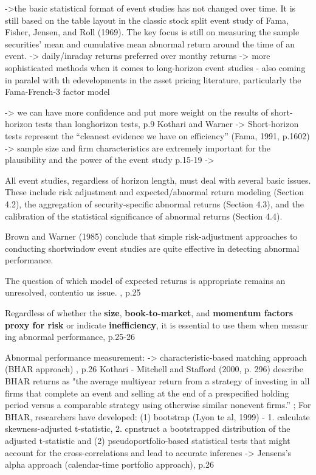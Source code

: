 \documentclass[12pt,a4paper]{article}
\begin{document}
->the basic statistical format of event studies has not changed over time. It is still based on the table layout in the classic stock split event study of Fama, Fisher, Jensen, and Roll (1969). The key focus is still on measuring the sample securities’ mean and cumulative mean abnormal return around the time of an event.
-> daily/inraday returns preferred over monthy returns
-> more sophisticated methods when it comes to long-horizon event studies - also coming in paralel with th edevelopments in the asset pricing literature, particularly the Fama-French-3 factor model

-> we can have more confidence and put more weight on the results of short-horizon tests than longhorizon tests, p.9 Kothari and Warner
-> Short-horizon tests represent the “cleanest evidence we have on efficiency” (Fama, 1991, p.1602)
-> sample size and firm characteristics are extremely important for the plausibility and the power of the event study p.15-19
-> 

All event studies, regardless of horizon length, must deal with several basic issues. These include risk adjustment and expected/abnormal return modeling (Section 4.2), the aggregation of security-specific abnormal returns (Section 4.3), and the calibration of the statistical significance of abnormal returns (Section 4.4).

Brown and Warner (1985) conclude that simple risk-adjustment approaches to conducting shortwindow event studies are quite effective in detecting abnormal performance.

The question of which model of expected returns is appropriate remains an unresolved, contentio us issue. , p.25

Regardless of whether the \textbf{size}, \textbf{book-to-market}, and \textbf{momentum factors proxy for risk }or indicate \textbf{inefficiency}, it is essential to use them when measur ing abnormal performance, p.25-26

Abnormal performance measurement: 
-> characteristic-based matching approach (BHAR approach) , p.26 Kothari - Mitchell and Stafford (2000, p. 296) describe BHAR returns as "the average multiyear return from a strategy of investing in all firms that complete an event and selling at the end of a prespecified holding period versus a comparable strategy using otherwise similar nonevent firms.” ; 
For BHAR, researchers have developed:
(1) bootstrap (Lyon te al, 1999) - 1. calculate skewness-adjusted t-statistic, 2. cpnstruct a bootstrapped distribution of the adjusted t-statistic and 
(2) pseudoportfolio-based statistical tests that might account for the cross-correlations and lead to accurate inferenes
-> Jensens's alpha approach (calendar-time portfolio approach), p.26
\end{document}
